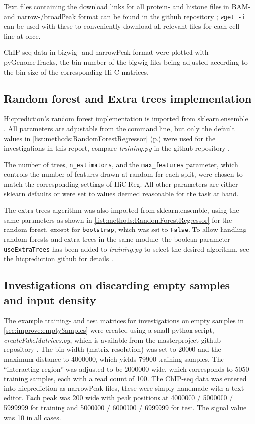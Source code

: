 Text files containing the download links for all protein- and histone files in BAM- and narrow-/broadPeak format can be found in the github repository
\cite{Krauth2020}; \texttt{wget -i} can be used with these to conveniently download all relevant files for each cell line at once.

ChIP-seq data in bigwig- and narrowPeak format were plotted with pyGenomeTracks, 
the bin number of the bigwig files being adjusted according to the bin size of the corresponding Hi-C matrices.

\subsection{Random forest and Extra trees implementation} \label{sec:methods:randomForestImplementation}
Hicprediction's random forest implementation is imported from sklearn.ensemble \cite{Pedregosa2011,scikitEnsemble2019}.
All parameters are adjustable from the command line, but only the default values in \autoref{list:methods:RandomForestRegressor} 
(p.\;\pageref{list:methods:RandomForestRegressor}) were used for the investigations in this report, 
compare \emph{training.py} in the github repository \cite{Krauth2020}.

The number of trees, \texttt{n\_estimators}, and the \texttt{max\_features} parameter,
which controls the number of features drawn at random for each split,
were chosen to match the corresponding settings of HiC-Reg.
All other parameters are either sklearn defaults or were set to values deemed reasonable for the task at hand.

The extra trees algorithm was also imported from sklearn.ensemble, 
using the same parameters as shown in \autoref{list:methods:RandomForestRegressor} for the random forest, 
except for \texttt{bootstrap}, which was set to \texttt{False}.
To allow handling random forests and extra trees in the same module, 
the boolean parameter \texttt{--useExtraTrees} has been added to \emph{training.py} to select
the desired algorithm, see the hicprediction github for details \cite{Krauth2020}.

\subsection{Investigations on discarding empty samples and input density} \label{sec:methods:discardEmpty}
The example training- and test matrices for investigations on empty samples in \autoref{sec:improve:emptySamples} 
were created using a small python script, \emph{createFakeMatrices.py}, which is available from the masterproject github repository \cite{Krauth2020}.
The bin width (matrix resolution) was set to \SI{20000}{\bp} and the maximum distance to \SI{4000000}{\bp}, 
which yields \num{79900} training samples. 
The ``interacting region'' was adjusted to be \SI{2000000}{\bp} wide, which corresponds to \num{5050} training samples, 
each with a read count of 100.
The ChIP-seq data was entered into hicprediction as narrowPeak files, these were simply handmade with a text editor.
Each peak was \SI{200}{\bp} wide with peak positions at \num{4000000} / \num{5000000} / \SI{5999999}{\bp} for training 
and \num{5000000} / \num{6000000} / \SI{6999999}{\bp} for test.
The signal value was 10 in all cases.

